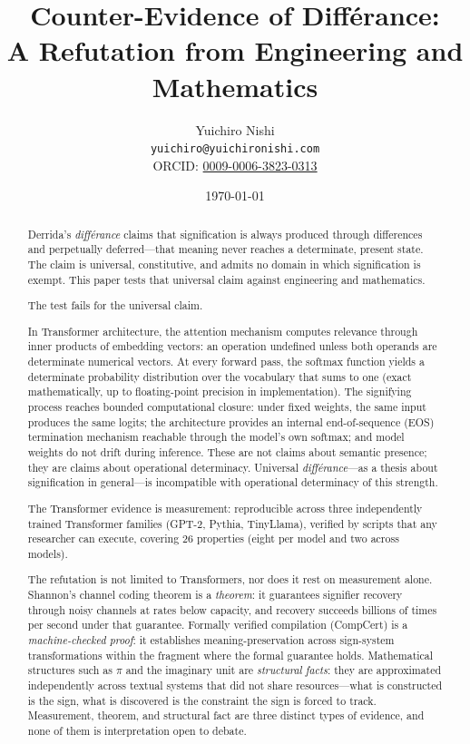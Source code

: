 \documentclass[a4paper,twocolumn,11pt]{article}
\title{Counter-Evidence of Diff\'erance:\\A Refutation from Engineering and Mathematics}
\author{Yuichiro Nishi\\{\small \texttt{yuichiro@yuichironishi.com}}\\{\small ORCID: \href{https://orcid.org/0009-0006-3823-0313}{0009-0006-3823-0313}}}
\date{\today}
\begin{document}
\maketitle

\begin{abstract}
Derrida's \emph{diff\'erance} claims that signification is always produced through differences and perpetually deferred---that meaning never reaches a determinate, present state. The claim is universal, constitutive, and admits no domain in which signification is exempt. This paper tests that universal claim against engineering and mathematics.

The test fails for the universal claim.

In Transformer architecture, the attention mechanism computes relevance through inner products of embedding vectors: an operation undefined unless both operands are determinate numerical vectors. At every forward pass, the softmax function yields a determinate probability distribution over the vocabulary that sums to one (exact mathematically, up to floating-point precision in implementation). The signifying process reaches bounded computational closure: under fixed weights, the same input produces the same logits; the architecture provides an internal end-of-sequence (EOS) termination mechanism reachable through the model's own softmax; and model weights do not drift during inference. These are not claims about semantic presence; they are claims about operational determinacy. Universal \emph{diff\'erance}---as a thesis about signification in general---is incompatible with operational determinacy of this strength.

The Transformer evidence is measurement: reproducible across three independently trained Transformer families (GPT-2, Pythia, TinyLlama), verified by scripts that any researcher can execute, covering 26 properties (eight per model and two across models).

The refutation is not limited to Transformers, nor does it rest on measurement alone. Shannon's channel coding theorem is a \emph{theorem}: it guarantees signifier recovery through noisy channels at rates below capacity, and recovery succeeds billions of times per second under that guarantee. Formally verified compilation (CompCert) is a \emph{machine-checked proof}: it establishes meaning-preservation across sign-system transformations within the fragment where the formal guarantee holds. Mathematical structures such as $\pi$ and the imaginary unit are \emph{structural facts}: they are approximated independently across textual systems that did not share resources---what is constructed is the sign, what is discovered is the constraint the sign is forced to track. Measurement, theorem, and structural fact are three distinct types of evidence, and none of them is interpretation open to debate.


\end{abstract}
\end{document}
